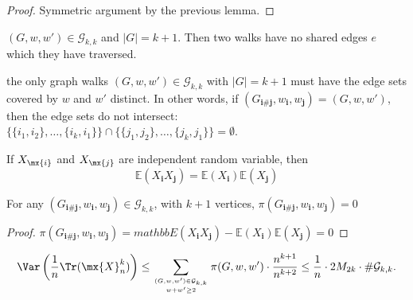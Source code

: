 \begin{lemma}\label{lem:walk_j_traverse_twice}
    \notready
    \begin{proof}
     Symmetric argument by the previous lemma.
    \end{proof}
\end{lemma}


\begin{lemma}\label{lem:no_shared_edges}
    $(G, w, w') \in \mathcal{G}_{k, k}$ and $|G| = k + 1$. Then two walks have no shared edges $e$ which they have traversed.
\end{lemma}


\begin{lemma}\label{lem:disjoint_edge_set}
    \notready
    the only graph walks $(G,w,w')\in \mathcal{G}_{k,k}$ with $|G|=k+1$ must have the edge sets covered by $w$ and $w'$ distinct.  
    In other words, if $(G_{\mathbf{i}\#\mathbf{j}},w_\mathbf{i},w_\mathbf{j}) = (G,w,w')$, then the edge sets do not intersect: 
    $\{\{i_1,i_2\},\ldots,\{i_k,i_1\}\}\cap\{\{j_1,j_2\},\ldots,\{j_k,j_1\}\}=\emptyset$. 
\end{lemma}



\begin{lemma}\label{lem:independent_expectation}
   \notready
   If $X_{\mx{i}}$ and $X_{\mx{j}}$ are independent random variable, then $$\mathbb{E}(X_{\mathbf{i}}X_{\mathbf{j}}) = \mathbb{E}(X_{\mathbf{i}})\mathbb{E}(X_{\mathbf{j}}) $$

\end{lemma}


\begin{lemma}\label{lem:G_leq_k}
    \notready
    For any $(G_{\mathbf{i}\#\mathbf{j}},w_\mathbf{i},w_\mathbf{j}) \in \mathcal{G}_{k,k}$, with $k + 1$ vertices, $\pi(G_{\mathbf{i}\#\mathbf{j}},w_\mathbf{i},w_\mathbf{j})  = 0$ 
    \begin{proof}
     $\pi(G_{\mathbf{i}\#\mathbf{j}},w_\mathbf{i},w_\mathbf{j}) = mathbb{E}(X_{\mathbf{i}}X_{\mathbf{j}}) - \mathbb{E}(X_{\mathbf{i}})\mathbb{E}(X_{\mathbf{j}})  = 0$
    \end{proof}
\end{lemma}


\begin{lemma}\label{lem:elimination_k+1}
    \notready

    \[ \Var\left( \frac1n\Tr(\mx{X}_n^k)\right) \le \sum_{(G,w,w')\in\mathcal{G}_{k,k}\atop w+w'\ge 2} \pi(G,w,w')\cdot \frac{n^{k+1}}{n^{k+2}} \le \frac1n\cdot 2M_{2k}\cdot \#\mathcal{G}_{k,k}. \]

\end{lemma}


